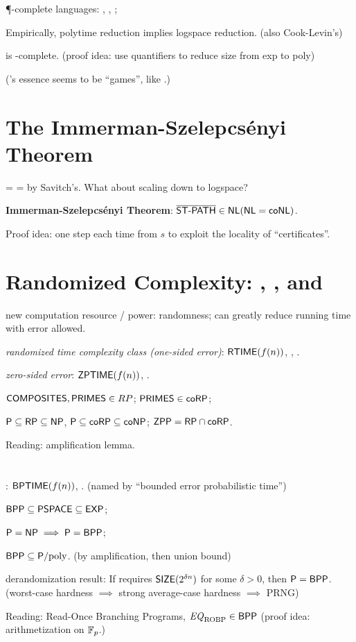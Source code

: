\documentclass{article}
\begin{document}
\P-complete languages: , , ;
\par
Empirically, polytime reduction implies logspace reduction. (also Cook-Levin's)
\par
{} is \PSPACE-complete. (proof idea: use quantifiers to reduce size from exp to poly)
\par
(\PSPACE's essence seems to be ``games'', like .)


\section{The Immerman-Szelepcsényi Theorem}

\NPSPACE = \coNPSPACE = \PSPACE by Savitch's. What about scaling down to logspace?
\par
\textbf{Immerman-Szelepcsényi Theorem}: $\overline{\text{\sf ST-PATH}} \in \text{\sf NL} (\text{\sf NL} = \text{\sf coNL})$.
\par
Proof idea: one step each time from $s$ to exploit the locality of ``certificates''.


\section{Randomized Complexity: \RP, \coRP, and \ZPP}

new computation resource / power: randomness; can greatly reduce running time with error allowed.
\par
\textit{randomized time complexity class (one-sided error)}: $\text{\sf RTIME}(f(n))$, \RP, \coRP.
\par
\textit{zero-sided error}: $\text{\sf ZPTIME}(f(n))$, \ZPP.
\par
$\text{\sf COMPOSITES}, \text{\sf PRIMES} \in RP$;
$\text{\sf PRIMES} \in \text{\sf coRP}$;
\par
$\text{\sf P} \subseteq \text{\sf RP} \subseteq \text{\sf NP}$, $\text{\sf P} \subseteq \text{\sf coRP} \subseteq \text{\sf coNP}$;
$\text{\sf ZPP} = \text{\sf RP} \cap \text{\sf coRP}$.
\par
Reading: amplification lemma.


\section{\BPP}

: $\text{\sf BPTIME}(f(n))$, \BPP. (named by ``bounded error probabilistic time'')
\par
$\text{\sf BPP} \subseteq \text{\sf PSPACE} \subseteq \text{\sf EXP}$;
\par
$\text{\sf P} = \text{\sf NP} \implies \text{\sf P} = \text{\sf BPP}$;
\par
$\BPP \subseteq \PslashPoly$. (by amplification, then union bound)
\par
derandomization result: If  requires $\text{\sf SIZE}(2^{\delta n})$ for some $\delta > 0$, then $\text{\sf P} = \text{\sf BPP}$.
(worst-case hardness $\implies$ strong average-case hardness $\implies$ PRNG)
\par
Reading: Read-Once Branching Programs, ${\it EQ}_{\rm ROBP} \in \text{\sf BPP}$ (proof idea: arithmetization on $\mathbb F_p$.)
\end{document}

